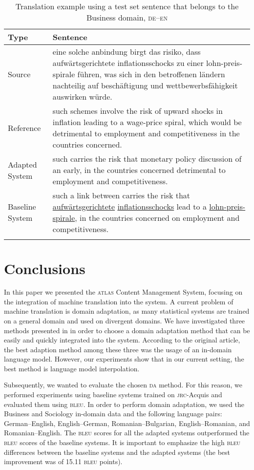 \documentclass[output=paper]{LSP/langsci}
\begin{document}
\begin{table}
\begin{tabularx}{\textwidth}{lX}
\lsptoprule
{Type} &{Sentence}\\
\midrule
Source & eine solche anbindung birgt das risiko, dass aufwärtsgerichtete
inflationsschocks zu einer lohn-preis-spirale führen, was sich in
den betroffenen ländern nachteilig auf beschäftigung und
wettbewerbsfähigkeit auswirken würde.\\
Reference & such schemes involve the risk of upward shocks in inflation leading
to a wage-price spiral, which would be detrimental to employment
and competitiveness in the countries concerned.\\
Adapted System & such carries the risk that monetary policy discussion of an early,
in the countries concerned detrimental to employment and competitiveness.\\
Baseline System & such a link between carries the risk that \underline{aufwärtsgerichtete}
\underline{inflationsschocks} lead to a \underline{lohn-preis-spirale}, in the countries
concerned on employment and competitiveness.\\
\lspbottomrule
\end{tabularx}
\caption{Translation example using a test set sentence that belongs to the Business domain, \textsc{de--en}}
\label{tab:dumavertan:8}
\end{table}

\section{Conclusions}\label{section:6}

In this paper we presented the \textsc{atlas} Content Management System, focusing on the integration of machine translation into the system. A current problem of machine translation is domain adaptation, as many statistical systems are trained on a general domain and used on divergent domains. We have investigated three methods presented in \citet{Koehn2007} in order to choose a domain adaptation method that can be easily and quickly integrated into the system. According to the original article, the best adaption method  
among these three was the usage of an in-domain language model. However, our experiments show that in our current setting, the best method is language model interpolation.

Subsequently, we wanted to evaluate the chosen \textsc{da} method. For this reason, we performed experiments using baseline systems trained on \textsc{jrc}-Acquis and evaluated them using \textsc{bleu}.  In order to perform domain adaptation, we used the Business and Sociology in-domain data and the following language pairs: 
Ger\-man--English, 
English--German, 
Romanian--Bulgarian, 
English--Romanian, and 
Ro\-manian--English. The \textsc{bleu} scores for all the adapted systems outperformed the \textsc{bleu} scores of the baseline systems. It is important to emphasize the high \textsc{bleu} differences between the baseline systems and the adapted systems  (the best improvement was of 15.11 \textsc{bleu} points). 
\end{document}

